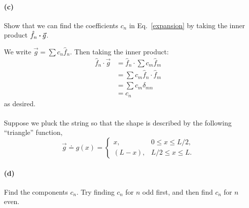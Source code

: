 \documentclass{article}
\begin{document}
\paragraph{(c)}
Show that we can find the coefficients $c_{n}$ in Eq.~\ref{expansion} by taking the inner product $\hat{f}_{n}\boldsymbol{\cdot}\vec{g}$.\\

\begin{solution}
    We write $\vec g = \sum c_n \hat f_n$. Then taking the inner product:
    \begin{align*}
        \hat f_n \cdot \vec g &= \hat f_n \cdot \sum c_m \hat f_m \\
        &= \sum c_m \hat f_n \cdot \hat f_m\\
        &= \sum c_m \delta_{mn}\\
        &= c_n
    \end{align*}
    as desired.
\end{solution}
\paragraph{}
Suppose we pluck the string so that the shape is described by the following ``triangle''  function,
	\begin{equation}
		\vec{g} \doteq g(x) = 
			\begin{cases}
				x, & 0\leq x \leq L/2,\\
				(L-x), & L/2 \leq x \leq L.
			\end{cases}
	\label{pluck}
	\end{equation}
\paragraph{(d)}		  
Find the components $c_{n}$.  Try finding $c_{n}$ for $n$ odd first, and then find $c_{n}$ for $n$ even.
\end{document}
